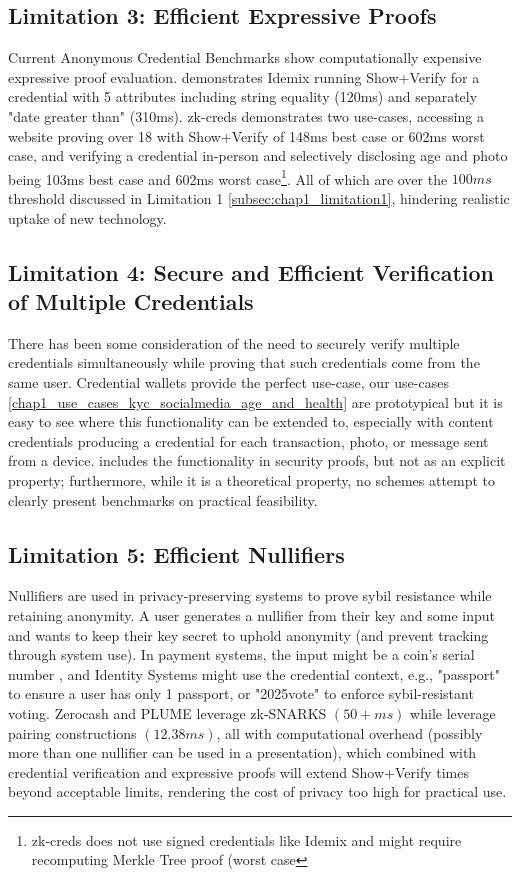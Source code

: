 \subsection{Limitation 3: Efficient Expressive Proofs}
Current Anonymous Credential Benchmarks show computationally expensive expressive proof evaluation. \cite{habib_evaluation_2016} demonstrates Idemix running Show+Verify for a credential with 5 attributes including string equality (120ms) and separately "date greater than" (310ms). zk-creds \cite{rosenberg_zk-creds_2022} demonstrates two use-cases, accessing a website proving over 18 with Show+Verify of 148ms best case or 602ms worst case, and verifying a credential in-person and selectively disclosing age and photo being 103ms best case and 602ms worst case\footnote{zk-creds does not use signed credentials like Idemix and might require recomputing Merkle Tree proof (worst case}. All of which are over the $100ms$ threshold discussed in Limitation 1 \ref{subsec:chap1_limitation1}, hindering realistic uptake of new technology. 


\subsection{Limitation 4: Secure and Efficient Verification of Multiple Credentials}
There has been some consideration of the need to securely verify multiple credentials simultaneously while proving that such credentials come from the same user. Credential wallets provide the perfect use-case, our use-cases \ref{chap1_use_cases_kyc_socialmedia_age_and_health} are prototypical but it is easy to see where this functionality can be extended to, especially with content credentials \cite{c2paorg_content_2024} producing a credential for each transaction, photo, or message sent from a device. \cite{dunkelman_formal_2016} includes the functionality in security proofs, but not as an explicit property; furthermore, while it is a theoretical property, no schemes attempt to clearly present benchmarks on practical feasibility. 


\subsection{Limitation 5: Efficient Nullifiers}
Nullifiers are used in privacy-preserving systems to prove sybil resistance while retaining anonymity. A user generates a nullifier from their key and some input and wants to keep their key secret to uphold anonymity (and prevent tracking through system use). In payment systems, the input might be a coin's serial number \cite{ben_sasson_zerocash_2014, tomescu_utt_2022}, and Identity Systems might use the credential context, e.g., "passport" to ensure a user has only 1 passport, or "2025vote" to enforce sybil-resistant voting. Zerocash \cite{ben_sasson_zerocash_2014} and PLUME \cite{gupta_plume_2022} leverage zk-SNARKS $(50+ms)$ while \cite{tomescu_utt_2022} leverage pairing constructions $(12.38ms)$, all with computational overhead (possibly more than one nullifier can be used in a presentation), which combined with credential verification and expressive proofs will extend Show+Verify times beyond acceptable limits, rendering the cost of privacy too high for practical use. 


